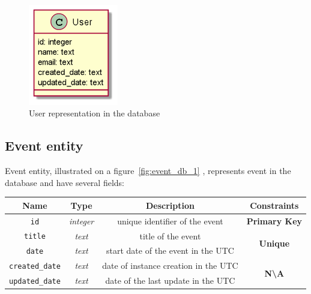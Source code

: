 \begin{figure}[h]
    \label{fig:user_db_1}
    \centering
    \includegraphics[width=0.35\textwidth]{images/user}
    \caption{User representation in the database}
\end{figure}

\subsection{Event entity}\label{subsec:event-entity}

Event entity, illustrated on a figure~\ref{fig:event_db_1} , represents event in the database and have several fields:

\begin{center}
    \begin{tabular}{ | c | c | c | c |}
        \hline
        \textbf{Name}          & \textbf{Type}    & \textbf{Description}                 & \textbf{Constraints}                         \\ \hline
        \texttt{id}            & \textit{integer} & unique identifier of the event       & \textbf{\color{red}Primary Key}              \\ \hline
        \texttt{title}         & \textit{text}    & title of the event                   & \multirow{2}{*}{\textbf{\color{blue}Unique}} \\ \cline{0-2}
        \texttt{date}          & \textit{text}    & start date of the event in the UTC   &                                              \\ \hline
        \texttt{created\_date} & \textit{text}    & date of instance creation in the UTC & \multirow{2}{*}{\textbf{N\textbackslash{A}}} \\ \cline{0-2}
        \texttt{updated\_date} & \textit{text}    & date of the last update in the UTC   &                                              \\ \hline
    \end{tabular}
\end{center}

